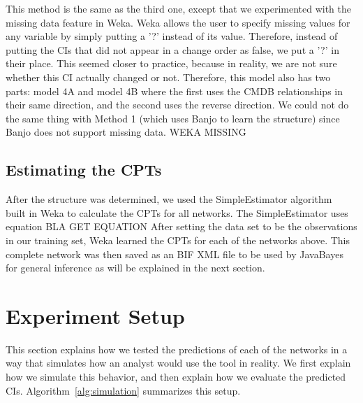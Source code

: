 \documentclass{article}
\begin{document}
This method is the same as the third one, except that we experimented with the missing data feature in Weka. Weka allows the user to specify missing values
for any variable by simply putting a '?' instead of its value. Therefore, instead of putting the CIs that did not appear in a change order as false, we put a
'?' in their place. This seemed closer to practice, because in reality, we are not sure whether this CI actually changed or not. Therefore, this model also has
two parts: model 4A and model 4B where the first uses the CMDB relationships in their same direction, and the second uses the reverse direction. We could not
do the same thing with Method 1 (which uses Banjo to learn the structure) since Banjo does not support missing data. WEKA MISSING

\subsection{Estimating the CPTs}
\label{sec:cpt}

After the structure was determined, we used the SimpleEstimator algorithm~\cite{witten2005data} built in Weka to calculate the CPTs for all networks. The
SimpleEstimator uses equation BLA GET EQUATION After setting the data set to be the observations in our training set, Weka learned the CPTs for each of the
networks above. This complete network was then saved as an BIF XML file to be used by JavaBayes for general inference as will be explained in the next section.


\section{Experiment Setup}
\label{sec:setup}

This section explains how we tested the predictions of each of the networks in a way that simulates how an analyst would use the tool in reality. We first
explain how we simulate this behavior, and then explain how we evaluate the predicted CIs. Algorithm~\ref{alg:simulation} summarizes this setup.
\end{document}

